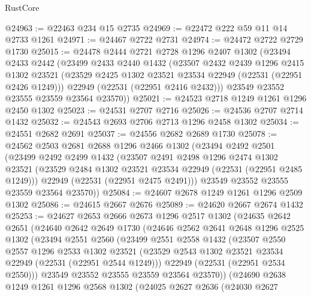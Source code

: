 \begin{lexlean}{RustCore}
\begin{coremodule}
@24963 := @22463 @234 @15 @2735
@24969 := @22472 @222 @59 @11 @14 @2733 @1261
@24971 := @24467 @2722 @2731
@24974 := @24472 @2722 @2729 @1730
@25015 := @24478
    @2444
    @2721
    @2728
    @1296
    @2407
    @1302
    (@23494
      @2433
      @2442
      (@23499
        @2433
        @2440
        @1432
        (@23507
          @2432
          @2439
          @1296
          @2415
          @1302
          @23521
          (@23529 @2425 @1302 @23521 @23534 @22949 (@22531 (@22951 @2426 @1249)))
          @22949
          (@22531 (@22951 @2416 @2432)))
        @23549
        @23552
        @23555
        @23559
        @23564
        @23570))
@25021 := @24523 @2718 @1249 @1261 @1296 @2450 @1302
@25023 := @24531 @2707 @2716
@25026 := @24536 @2707 @2714 @1432
@25032 := @24543 @2693 @2706 @2713 @1296 @2458 @1302
@25034 := @24551 @2682 @2691
@25037 := @24556 @2682 @2689 @1730
@25078 := @24562
    @2503
    @2681
    @2688
    @1296
    @2466
    @1302
    (@23494
      @2492
      @2501
      (@23499
        @2492
        @2499
        @1432
        (@23507
          @2491
          @2498
          @1296
          @2474
          @1302
          @23521
          (@23529 @2484 @1302 @23521 @23534 @22949 (@22531 (@22951 @2485 @1249)))
          @22949
          (@22531 (@22951 @2475 @2491)))
        @23549
        @23552
        @23555
        @23559
        @23564
        @23570))
@25084 := @24607 @2678 @1249 @1261 @1296 @2509 @1302
@25086 := @24615 @2667 @2676
@25089 := @24620 @2667 @2674 @1432
@25253 := @24627
    @2653
    @2666
    @2673
    @1296
    @2517
    @1302
    (@24635
      @2642
      @2651
      (@24640
        @2642
        @2649
        @1730
        (@24646
          @2562
          @2641
          @2648
          @1296
          @2525
          @1302
          (@23494
            @2551
            @2560
            (@23499
              @2551
              @2558
              @1432
              (@23507
                @2550
                @2557
                @1296
                @2533
                @1302
                @23521
                (@23529 @2543 @1302 @23521 @23534 @22949 (@22531 (@22951 @2544 @1249)))
                @22949
                (@22531 (@22951 @2534 @2550)))
              @23549
              @23552
              @23555
              @23559
              @23564
              @23570))
          (@24690
            @2638
            @1249
            @1261
            @1296
            @2568
            @1302
            (@24025
              @2627
              @2636
              (@24030
                @2627

\end{coremodule}
\end{lexlean}
